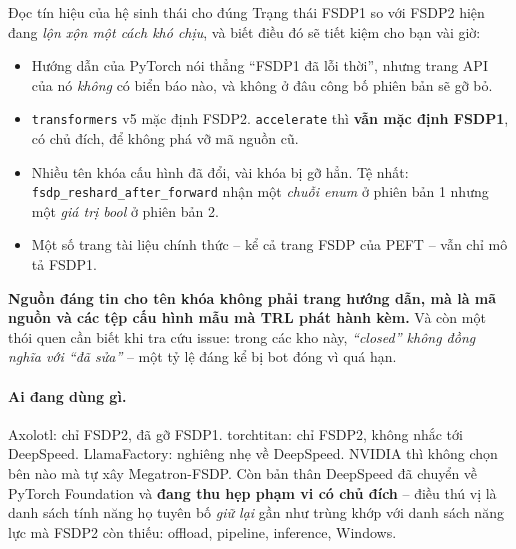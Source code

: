 \begin{deepdive}{Đọc tín hiệu của hệ sinh thái cho đúng}
Trạng thái FSDP1 so với FSDP2 hiện đang \emph{lộn xộn một cách khó chịu}, và biết điều đó sẽ tiết kiệm cho bạn vài giờ:
\begin{itemize}
	\item Hướng dẫn của PyTorch nói thẳng “FSDP1 đã lỗi thời”, nhưng trang API của nó \emph{không} có biển báo nào, và không ở đâu công bố phiên bản sẽ gỡ bỏ.
	\item \texttt{transformers} v5 mặc định FSDP2. \texttt{accelerate} thì \textbf{vẫn mặc định FSDP1}, có chủ đích, để không phá vỡ mã nguồn cũ.
	\item Nhiều tên khóa cấu hình đã đổi, vài khóa bị gỡ hẳn. Tệ nhất: \texttt{fsdp\_\allowbreak reshard\_\allowbreak after\_\allowbreak forward} nhận một \emph{chuỗi enum} ở phiên bản 1 nhưng một \emph{giá trị bool} ở phiên bản 2.
	\item Một số trang tài liệu chính thức -- kể cả trang FSDP của PEFT -- vẫn chỉ mô tả FSDP1.
\end{itemize}
\textbf{Nguồn đáng tin cho tên khóa không phải trang hướng dẫn, mà là mã nguồn và các tệp cấu hình mẫu mà TRL phát hành kèm.} Và còn một thói quen cần biết khi tra cứu issue: trong các kho này, \emph{“closed” không đồng nghĩa với “đã sửa”} -- một tỷ lệ đáng kể bị bot đóng vì quá hạn.
\end{deepdive}

\paragraph{Ai đang dùng gì.} Axolotl: chỉ FSDP2, đã gỡ FSDP1. torchtitan: chỉ FSDP2, không nhắc tới DeepSpeed. LlamaFactory: nghiêng nhẹ về DeepSpeed. NVIDIA thì không chọn bên nào mà tự xây Megatron-FSDP. Còn bản thân DeepSpeed đã chuyển về PyTorch Foundation và \textbf{đang thu hẹp phạm vi có chủ đích} -- điều thú vị là danh sách tính năng họ tuyên bố \emph{giữ lại} gần như trùng khớp với danh sách năng lực mà FSDP2 còn thiếu: offload, pipeline, inference, Windows.
